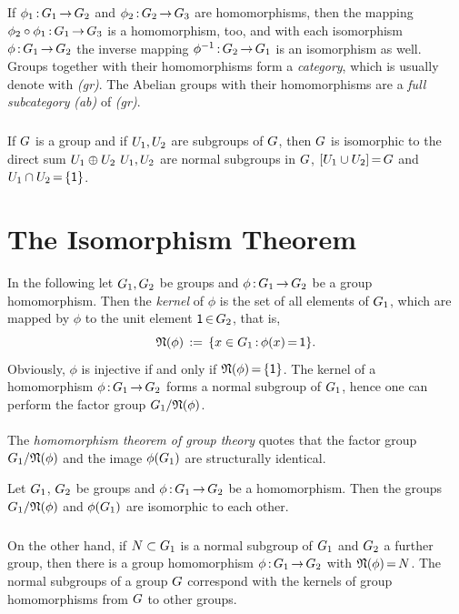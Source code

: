 \documentclass[11pt,twoside]{article}
\begin{document}
\subparagraph{}
If $\phi_1 {\,:\,} G_1 {\,\to\,} G_2$ and $\phi_2 {\,:\,} G_2 {\,\to\,} G_3$
are homomorphisms,
then the mapping $\phi_2 \circ \phi_1 {\,:\,} G_1 {\,\to\,} G_3$
is a homomorphism, too,
and with each isomorphism $\phi       {\,:\,} G_1 {\,\to\,} G_2$
the inverse mapping        $\phi^{-1} {\,:\,} G_2 {\,\to\,} G_1$
is an isomorphism as well.
Groups together with their homomorphisms form a \textit{category},
which is usually denote with \textit{(gr)}.
The Abelian groups with their homomorphisms
are a \textit{full subcategory} \textit{(ab)} of \textit{(gr)}.

\subparagraph{}
If $G$ is a group and if $U_1,U_2$ are subgroups of $G$,
then $G$ is isomorphic to the direct sum $U_1 \oplus U_2$
\iff $U_1,U_2$ are normal subgroups in $G$,
$[U_1 \cup U_2] {\,=\,} G$
and $U_1 \cap U_2 {\,=\,} \{ {\mathsf{1}} \}$.

\section{The Isomorphism Theorem}
In the following let $G_1,G_2$ be groups and
$\phi {\,:\,} G_1 {\,\to\,} G_2$ be a group homomorphism.
Then the \textit{kernel} of $\phi$ is the set of all elements of $G_1$,
which are mapped by $\phi$ to the unit element ${\mathsf{1}} {\,\in\,} G_2$,
that is,
\[
\mathfrak{N}(\phi) \,:=\, \{x \in G_1 {\,:\,} \phi(x) {\,=\,} {\mathsf{1}} \}.
\]
Obviously,
$\phi$ is injective if and only if $\mathfrak{N}(\phi) {\,=\,} \{{\mathsf{1}}\}$.
The kernel of a homomorphism $\phi {\,:\,} G_1 {\,\to\,} G_2$
forms a normal subgroup of $G_1$,
hence one can perform the factor group $G_1 / \mathfrak{N}(\phi)$.

\paragraph{}
The \textit{homomorphism theorem of group theory} quotes
that the factor group $G_1 / \mathfrak{N}(\phi)$ and the image
$\phi(G_1)$ are structurally identical.

\begin{theorem}
Let $G_1$, $G_2$ be groups and $\phi {\,:\,} G_1 {\,\to\,} G_2$
be a homomorphism.
Then the groups $G_1 / \mathfrak{N}(\phi)$ and $\phi(G_1)$
are isomorphic to each other.
\end{theorem}

\subparagraph{}
On the other hand,
if $N \subset G_1$ is a normal subgroup of $G_1$
and $G_2$ a further group,
then there is a group homomorphism $\phi {\,:\,} G_1 {\,\to\,} G_2$
with $\mathfrak{N}(\phi) {\,=\,} N$.
The normal subgroups of a group $G$ correspond with the kernels
of group homomorphisms from $G$ to other groups.
\end{document}
